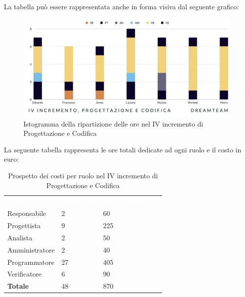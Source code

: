 La tabella può essere rappresentata anche in forma visiva dal seguente grafico:
\begin{figure}[H]
\centering
\includegraphics[scale=0.50]{Sezioni/SezioniPreventivo/grafici/progettazione/Progettazione_IV_incremento.png}
\caption{Istogramma della ripartizione delle ore nel IV incremento di Progettazione e Codifica}
\end{figure}

La seguente tabella rappresenta le ore totali dedicate ad ogni ruolo e il costo in euro:

\begin{table}[H]
\begin{center}
\renewcommand{\arraystretch}{1.5}
\begin{tabular}{ m{}<{\centering}  m{}<{\centering} m{}<{\centering}}
	\rowcolor{darkblue}
	\textcolor{white}{\textbf{Ruolo}}&\textcolor{white}{\textbf{Totale ore}}&\textcolor{white}{\textbf{Costo totale (\euro)}}\\ 

	Responsabile  & 2 & 60 \\	
	
	Progettista & 9 & 225 \\
	
	Analista & 2 & 50 \\

	Amministratore & 2 & 40 \\
	
	Programmatore & 27 & 405 \\
	
	Verificatore & 6 & 90 \\
	
	\textbf{Totale} & 48 & 870 \\
	
\end{tabular}
\caption{Prospetto dei costi per ruolo nel IV incremento di Progettazione e Codifica}
\end{center}
\end{table}

